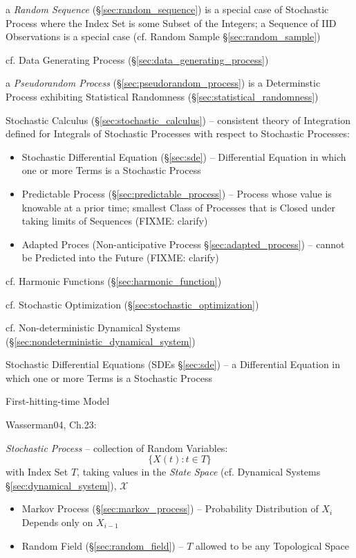\fist a \emph{Random Sequence} (\S\ref{sec:random_sequence}) is a special case
of Stochastic Process where the Index Set is some Subset of the Integers; a
Sequence of IID Observations is a special case (cf. Random Sample
\S\ref{sec:random_sample})

\fist cf. Data Generating Process (\S\ref{sec:data_generating_process})

\fist a \emph{Pseudorandom Process} (\S\ref{sec:pseudorandom_process}) is a
Determinstic Process exhibiting Statistical Randomness
(\S\ref{sec:statistical_randomness})

\fist Stochastic Calculus (\S\ref{sec:stochastic_calculus}) -- consistent theory
of Integration defined for Integrals of Stochastic Processes with respect to
Stochastic Processes:
\begin{itemize}
  \item Stochastic Differential Equation (\S\ref{sec:sde}) -- Differential
    Equation in which one or more Terms is a Stochastic Process
  \item Predictable Process (\S\ref{sec:predictable_process}) -- Process whose
    value is knowable at a prior time; smallest Class of Processes that is
    Closed under taking limits of Sequences (FIXME: clarify)
  \item Adapted Proces (Non-anticipative Process \S\ref{sec:adapted_process}) --
    cannot be Predicted into the Future (FIXME: clarify)
\end{itemize}

cf. Harmonic Functions (\S\ref{sec:harmonic_function})

\fist cf. Stochastic Optimization (\S\ref{sec:stochastic_optimization})

\fist cf. Non-deterministic Dynamical Systems
(\S\ref{sec:nondeterministic_dynamical_system})

\fist Stochastic Differential Equations (SDEs \S\ref{sec:sde}) -- a Differential
Equation in which one or more Terms is a Stochastic Process

First-hitting-time Model

Wasserman04, Ch.23:

\emph{Stochastic Process} -- collection of Random Variables:
\[
  \{ X(t) : t \in T \}
\]
with Index Set $T$, taking values in the \emph{State Space} (cf. Dynamical
Systems \S\ref{sec:dynamical_system}), $\mathcal{X}$

\begin{itemize}
  \item Markov Process (\S\ref{sec:markov_process}) -- Probability Distribution
    of $X_i$ Depends only on $X_{i-1}$
  \item Random Field (\S\ref{sec:random_field}) -- $T$ allowed to be any
    Topological Space
\end{itemize}

